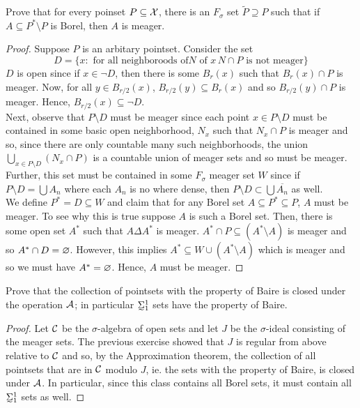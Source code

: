 \begin{exercise}
    Prove that for every poinset $P \subseteq \mathcal{X}$, there is an $F_{\sigma}$ set $\tilde{P} \supseteq P$ such that if $A \subseteq P^*\setminus P$ is Borel, then $A$ is meager. 
\end{exercise}

\begin{proof}
    Suppose $P$ is an arbitary pointset. Consider the set 
    \[ D = \{x \colon \text{ for all neighboroods of} N \text{ of }x \, N\cap P \text{ is not meager}\} \] 
    $D$ is open since if $x \in \neg D$, then there is some $B_r(x)$ such that $B_r(x) \cap P$ is meager. Now, for all $y \in B_{r/2}(x)$, $B_{r/2}(y) \subseteq B_r(x)$ and so $B_{r/2}(y) \cap P$ is meager. Hence, $B_{r/2}(x) \subseteq \neg D$. \\
    Next, observe that $P\setminus D$ must be meager since each point $x \in P \setminus D$ must be contained in some basic open neighborhood, $N_x$ such that $N_x \cap P$ is meager and so, since there are only countable many such neighborhoods, the union $\bigcup_{x \in P \setminus D} (N_x \cap P)$ is a countable union of meager sets and so must be meager. Further, this set must be contained in some $F_{\sigma}$ meager set $W$ since if $P \setminus D = \bigcup A_n$ where each $A_n$ is no where dense, then $P \setminus D \subset \bigcup \overline{A_n}$ as well. \\
    We define $P^* = D \subseteq W$ and claim that for any Borel set $A \subseteq P^* \subseteq P$, $A$ must be meager. To see why this is true suppose $A$ is such a Borel set. Then, there is some open set $A^*$ such that $A \Delta A^*$ is meager. $A^* \cap P \subseteq (A^* \setminus A)$ is meager and so $A^* \cap D = \varnothing$. However, this implies $A^* \subseteq W \cup (A^* \setminus A)$ which is meager and so we must have $A^* = \varnothing$. Hence, $A$ must be meager. 
\end{proof}

\begin{exercise}
    Prove that the collection of pointsets with the property of Baire is closed under the operation $\mathcal{A}$; in particular $\undertilde{\Sigma}_1^1$ sets have the property of Baire. 
\end{exercise}

\begin{proof}
    Let $\mathcal{C}$ be the $\sigma$-algebra of open sets and let $J$ be the $\sigma$-ideal consisting of the meager sets. The previous exercise showed that $J$ is regular from above relative to $\mathcal{C}$ and so, by the Approximation theorem, the collection of all pointsets that are in $\mathcal{C}$ modulo $J$, ie. the sets with the property of Baire, is closed under $\mathcal{A}$. In particular, since this class contains all Borel sets, it must contain all $\undertilde{\Sigma}_1^1$ sets as well. 
\end{proof}